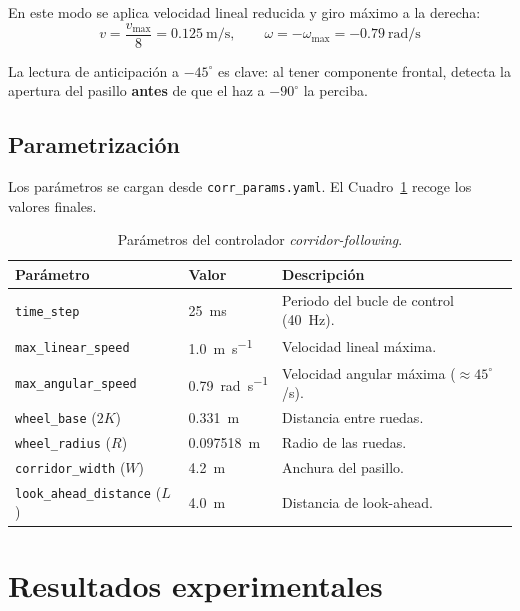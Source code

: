 \documentclass[12pt]{article}
\begin{document}
En este modo se aplica velocidad lineal reducida y giro m\'{a}ximo a la derecha:
\[
  v = \frac{v_\text{max}}{8} = \SI{0.125}{\meter\per\second}, \qquad
  \omega = -\omega_\text{max} = -\SI{0.79}{\radian\per\second}
\]

La lectura de anticipaci\'{o}n a $-45^\circ$ es clave: al tener componente frontal, detecta la apertura del pasillo \textbf{antes} de que el haz a $-90^\circ$ la perciba.

\subsection{Parametrizaci\'{o}n}
Los par\'{a}metros se cargan desde \texttt{corr\_params.yaml}. El Cuadro~\ref{tab:parametros} recoge los valores finales.

\begin{table}[H]
  \centering
  \caption{Par\'{a}metros del controlador \emph{corridor-following}.}
  \label{tab:parametros}
  \begin{tabularx}{0.98\linewidth}{l l X}
    \toprule
    \textbf{Par\'{a}metro} & \textbf{Valor} & \textbf{Descripci\'{o}n} \\
    \midrule
    \texttt{time\_step}             & \SI{25}{\milli\second} & Periodo del bucle de control (40~Hz). \\
    \texttt{max\_linear\_speed}     & \SI{1.0}{\meter\per\second} & Velocidad lineal m\'{a}xima. \\
    \texttt{max\_angular\_speed}    & \SI{0.79}{\radian\per\second} & Velocidad angular m\'{a}xima ($\approx 45^\circ$/s). \\
    \texttt{wheel\_base} ($2K$)     & \SI{0.331}{\meter} & Distancia entre ruedas. \\
    \texttt{wheel\_radius} ($R$)    & \SI{0.097518}{\meter} & Radio de las ruedas. \\
    \texttt{corridor\_width} ($W$)  & \SI{4.2}{\meter} & Anchura del pasillo. \\
    \texttt{look\_ahead\_distance} ($L$) & \SI{4.0}{\meter} & Distancia de look-ahead. \\
    \bottomrule
  \end{tabularx}
\end{table}


\section{Resultados experimentales}
\end{document}
